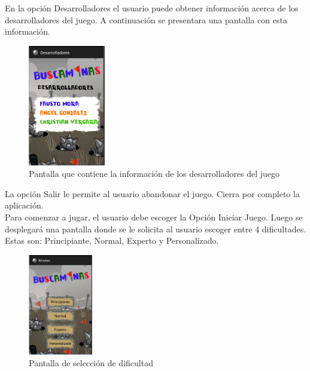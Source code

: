 \documentclass[11pt]{article} %
\begin{document}
En la opci\'on Desarrolladores el usuario puede obtener informaci\'on acerca de los desarrolladores del juego. A continuaci\'on se presentara una pantalla con esta informaci\'on.
\begin{center}

	\begin{figure}[h!]
  		\centering
    		\includegraphics[width=0.3\textwidth]{imagenes/Desarrolladores.PNG}
  		\caption{Pantalla que contiene la informaci\'on de los desarrolladores del juego}
		\label{fig:desarrolladores}
	\end{figure}
\end{center}
La opci\'on Salir le permite al usuario abandonar el juego. Cierra por completo la aplicaci\'on.
\\Para comenzar a jugar, el usuario debe escoger la Opci\'on Iniciar Juego. Luego se desplegar\'a una pantalla donde se le solicita al usuario escoger entre 4 dificultades. Estas son: Principiante, Normal, Experto y Personalizado.
\begin{center}

	\begin{figure}[h!]
  		\centering
    		\includegraphics[width=0.25\textwidth]{imagenes/Dificultades.PNG}
  		\caption{Pantalla de selecci\'on de dificultad}
		\label{fig:dificultades}
	\end{figure}
\end{center}
\end{document}
